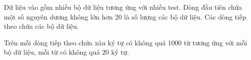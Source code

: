 Dữ liệu vào gồm nhiều bộ dữ liệu tương ứng với nhiều test. Dòng đầu tiên chứa một số nguyên dương không lớn hơn 20 là số lượng các bộ dữ liệu. Các dòng tiếp theo chứa các bộ dữ liệu.  

   Trên mỗi dòng tiếp theo chứa xâu ký tự có không quá 1000 từ tương ứng với mỗi bộ dữ liệu, mỗi từ có không quá 20 ký tự.